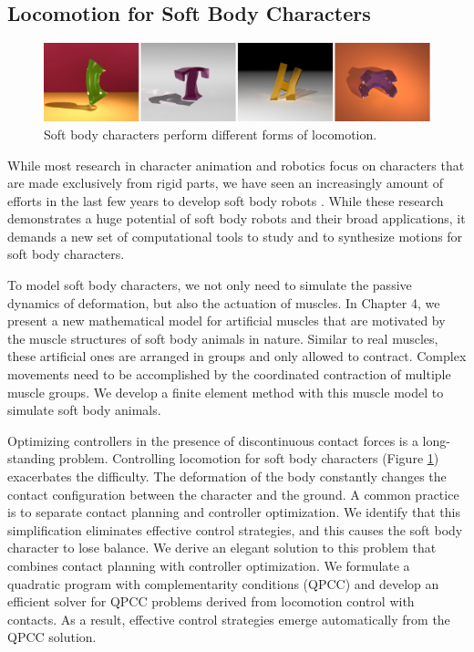 \subsection{Locomotion for Soft Body Characters}

\begin{figure}[!h]
  \centering
    \includegraphics[width=\textwidth]{figures/teaserSoftBody.eps}
  \caption{Soft body characters perform different forms of locomotion.}
  \label{fig:teaser2}
\end{figure}

While most research in character animation and robotics focus on characters that are made exclusively from rigid parts, we have seen an increasingly amount of efforts in the last few years to develop soft body robots \cite{}. While these research demonstrates a huge potential of soft body robots and their broad applications, it demands a new set of computational tools to study and to synthesize motions for soft body characters.

To model soft body characters, we not only need to simulate the passive dynamics of deformation, but also the actuation of muscles. In Chapter 4, we present a new mathematical model for artificial muscles that are motivated by the muscle structures of soft body animals in nature. Similar to real muscles, these artificial ones are arranged in groups and only allowed to contract. Complex movements need to be accomplished by the coordinated contraction of multiple muscle groups. We develop a finite element method with this muscle model to simulate soft body animals.

Optimizing controllers in the presence of discontinuous contact forces is a long-standing problem. Controlling locomotion for soft body characters (Figure \ref{fig:teaser2}) exacerbates the difficulty. The deformation of the body constantly changes the contact configuration between the character and the ground. A common practice is to separate contact planning and controller optimization. We identify that this simplification eliminates effective control strategies, and this causes the soft body character to lose balance. We derive an elegant solution to this problem that combines contact planning with controller optimization. We formulate a quadratic program with complementarity conditions (QPCC) and develop an efficient solver for QPCC problems derived from locomotion control with contacts. As a result, effective control strategies emerge automatically from the QPCC solution.

